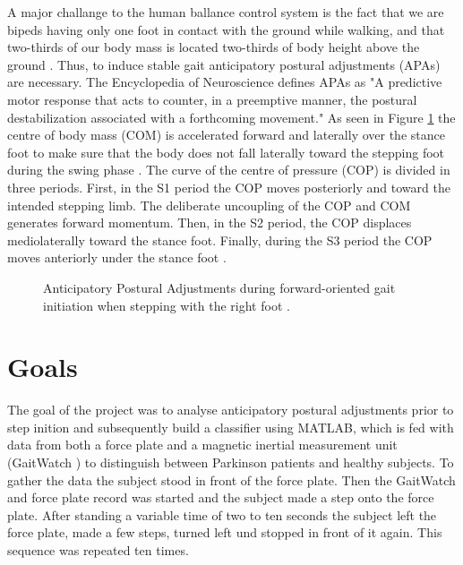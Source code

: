 A major challange to the human ballance control system is the fact that we are bipeds having only one foot in contact with the ground while walking, and that two-thirds  of our body mass is located two-thirds of body height above the ground \cite{halliday_initiation_1998}. Thus, to induce stable gait anticipatory postural adjustments (APAs) are necessary. The Encyclopedia of Neuroscience \cite[p.133]{woollacott_anticipatory_2009} defines APAs as "A predictive motor response that acts to counter, in a preemptive manner, the postural destabilization associated with a forthcoming movement." As seen in Figure \ref{fig:APAoverview} the centre of body mass (COM) is accelerated forward and laterally over the stance foot to make sure that the body does not fall laterally toward the stepping foot during the swing phase \cite{woollacott_anticipatory_2009}. The curve of the centre of pressure (COP) is divided in three periods. First, in the S1 period the COP moves posteriorly and toward the intended stepping limb. The deliberate uncoupling of the COP and COM generates forward momentum. Then, in the S2 period, the COP displaces mediolaterally toward the stance foot. Finally, during the S3 period the COP moves anteriorly under the stance foot \cite{hass_gait_2005-1}.

\begin{figure}
	\centering
	\caption{Anticipatory Postural Adjustments during forward-oriented gait initiation when stepping with the right foot \cite{hass_gait_2005-1}.}
	\label{fig:APAoverview}
\end{figure}


\section{Goals}

The goal of the project was to analyse anticipatory postural adjustments prior to step inition and subsequently build a classifier using MATLAB, which is fed with data from both a force plate and a magnetic inertial measurement unit (GaitWatch \cite{olivares_vicente_gaitwatch_2013}) to distinguish between Parkinson patients and healthy subjects. To gather the data the subject stood in front of the force plate. Then the GaitWatch and force plate record was started and the subject made a step onto the force plate. After standing a variable time of two to ten seconds the subject left the force plate, made a few steps, turned left und stopped in front of it again. This sequence was repeated ten times.


